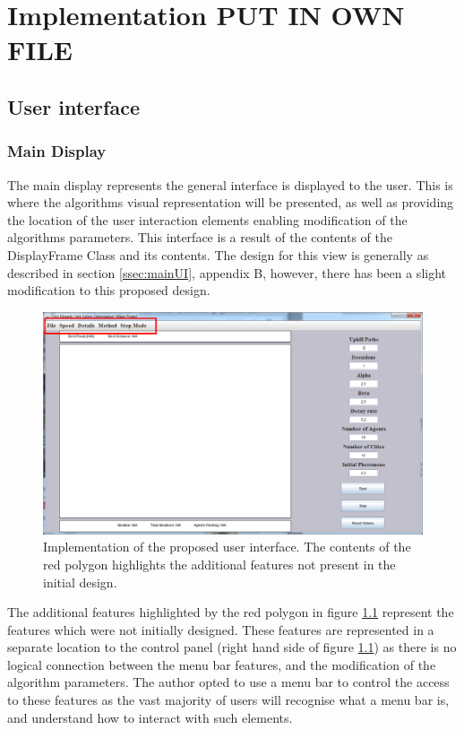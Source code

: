 \chapter{Implementation PUT IN OWN FILE}

\section{User interface}
\subsection{Main Display}
\label{mainimp}
The main display represents the general interface is displayed to the user. This is where the algorithms visual representation will be presented, as well as providing the location of the user interaction elements enabling modification of the algorithms parameters. This interface is a result of the contents of the DisplayFrame Class and its contents. The design for this view is generally as described in section \ref{ssec:mainUI}, appendix B, however, there has been a slight modification to this proposed design.

\begin{figure}[H]
\centering
\includegraphics[scale=0.35]{Images/chapter4/displayFrame}
\caption{Implementation of the proposed user interface. The contents of the red polygon highlights the additional features not present in the initial design.}
\label{fig:displayFrameImp}
\end{figure}

The additional features highlighted by the red polygon in figure \ref{fig:displayFrameImp} represent the features which were not initially designed. These features are represented in a separate location to the control panel (right hand side of figure \ref{fig:displayFrameImp}) as there is no logical connection between the menu bar features, and the modification of the algorithm parameters. The author opted to use a menu bar to control the access to these features as the vast majority of users will recognise what a menu bar is, and understand how to interact with such elements. 

